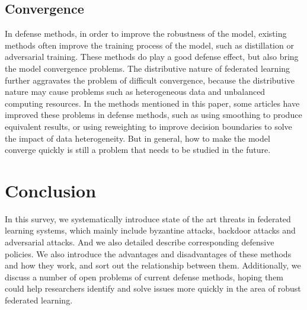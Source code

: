 \documentclass[pdflatex,sn-mathphys-num]{sn-jnl}%
\theoremstyle{thmstyleone}%
\theoremstyle{thmstyletwo}%
\theoremstyle{thmstylethree}%
\begin{document}
    \subsection{Convergence}
    In defense methods, in order to improve the robustness
    of the model, existing methods often improve the training
    process of the model, such as distillation or adversarial
    training. These methods do play a good defense effect, but
    also bring the model convergence problems. The distributive
    nature of federated learning further aggravates the
    problem of diﬀicult convergence, because the distributive
    nature may cause problems such as heterogeneous data
    and unbalanced computing resources. In the methods
    mentioned in this paper, some articles have improved these
    problems in defense methods, such as using smoothing
    to produce equivalent results, or using reweighting to
    improve decision boundaries to solve the impact of data
    heterogeneity. But in general, how to make the model
    converge quickly is still a problem that needs to be studied
    in the future.
    \section{Conclusion}
    In this survey, we systematically introduce state of the art 
    threats in federated learning systems, which mainly
    include byzantine attacks, backdoor attacks and adversarial
    attacks. And we also detailed describe corresponding
    defensive policies. We also introduce the advantages and
    disadvantages of these methods and how they work, and
    sort out the relationship between them. Additionally, we
    discuss a number of open problems of current defense
    methods, hoping them could help researchers identify and
    solve issues more quickly in the area of robust federated
    learning.





\end{document}
